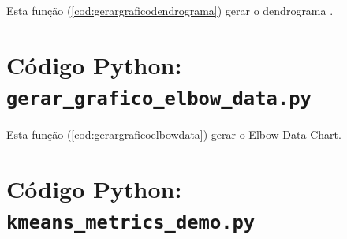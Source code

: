 \documentclass[12pt]{article} %
\begin{document}
	Esta função (\ref{cod:gerargraficodendrograma}) gerar o dendrograma \cite{2018e}.
	
	\label{cod:gerargraficodendrograma}
	
	\section{Código Python: \texttt{gerar\_grafico\_elbow\_data.py}}\label{apx:gerargraficoelbowdata}
	
	Esta função (\ref{cod:gerargraficoelbowdata}) gerar o Elbow Data Chart.
	
        \label{cod:gerargraficoelbowdata}

        \section{Código Python: \texttt{kmeans\_metrics\_demo.py}}\label{apx:kmeans_metrics_demo}

        

        \else
        \fi
        \fi
	
	\ifx\mycmd\undefined
	\else
	\if{}
		
		
		
		
		
		
		
		
		
		
	
	\else
	\fi
	\fi
	
\end{document}
